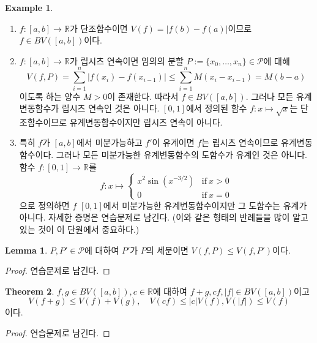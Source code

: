 \documentclass[11pt]{book}
\numberwithin{equation}{chapter}
\def\RR{\mathbb{R}}
\def\calP{\mathcal{P}}
\newcommand{\abs}[1]{\left\vert#1\right\vert}
\def\textif{\text{if}}
\theoremstyle{definition}
\newtheorem{thm}{Theorem}[section]
\newtheorem{lem}[thm]{Lemma}
\newtheorem*{ex}{Example}
\newenvironment{enum}
	{\begin{enumerate}[label=(\alph*), leftmargin=2\parindent]}
	{\end{enumerate}}
\begin{document}
\begin{ex}
    \quad

    \begin{enum}
        \item \(f : [a, b] \to \RR\)가 단조함수이면 \(V(f) = \abs{f(b) - f(a)}\)이므로 \(f \in BV([a, b])\)이다.
        \item \(f : [a, b] \to \RR\)가 립시츠 연속이면 임의의 분할 \(P := \{x_0, \ldots, x_n\} \in \calP\)에 대해
        \[
            V(f, P) = \sum_{i=1}^n \abs{f(x_{i}) - f(x_{i-1})} \le \sum_{i=1}^n M(x_i - x_{i-1}) = M(b - a)
        \]
        이도록 하는 양수 \(M > 0\)이 존재한다. 따라서 \(f \in BV([a, b])\). 그러나 모든 유계변동함수가 립시츠 연속인 것은 아니다. \([0, 1]\)에서 정의된 함수 \(f : x \mapsto \sqrt{x}\)는 단조함수이므로 유계변동함수이지만 립시츠 연속이 아니다.
        \item 특히 \(f\)가 \([a, b]\)에서 미분가능하고 \(f'\)이 유계이면 \(f\)는 립시츠 연속이므로 유계변동함수이다. 그러나 모든 미분가능한 유계변동함수의 도함수가 유계인 것은 아니다. 함수 \(f : [0, 1] \to \RR\)를
        \[
            f : x \mapsto
            \begin{cases}
                x^2 \sin (x^{-3/2}) &\textif \ x > 0\\
                0 &\textif \ x = 0
            \end{cases}
        \]
        으로 정의하면 \(f\) \([0, 1]\)에서 미분가능한 유계변동함수이지만 그 도함수는 유계가 아니다. 자세한 증명은 연습문제로 남긴다. (이와 같은 형태의 반례들을 많이 알고 있는 것이 이 단원에서 중요하다.)
    \end{enum}
\end{ex}

\begin{lem}
    \(P, P' \in \calP\)에 대하여 \(P'\)가 \(P\)의 세분이면 \(V(f, P) \le V(f, P')\)이다.
\end{lem}
\begin{proof}
    연습문제로 남긴다.
\end{proof}

\begin{thm}
    \(f, g \in BV([a, b]), c \in \RR\)에 대하여 \(f + g, cf, \abs{f} \in BV([a, b])\)이고
    \[
        V(f + g) \le V(f) + V(g), \quad V(cf) \le \abs{c}V(f), V(\abs{f}) \le V(f)
    \]
    이다.
\end{thm}
\begin{proof}
    연습문제로 남긴다.
\end{proof}
\end{document}
